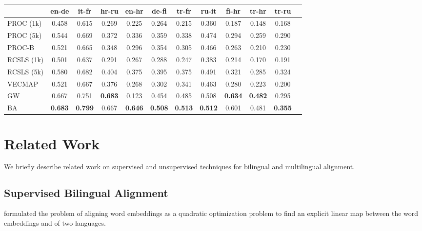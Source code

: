 \documentclass{article}
\begin{document}
\begin{table*}[ht!]
\centering

\begin{tabular}{@{}l@{}*{11}{c}@{}}
    \hline
    & en-de & it-fr & hr-ru & en-hr & de-fi & tr-fr & ru-it & fi-hr & tr-hr & tr-ru\\
    \hline
    PROC (1k)  & {0.458} & {0.615} & {0.269} & {0.225} & {0.264} & {0.215} & {0.360} & {0.187} & {0.148} & {0.168}\\
    PROC (5k) & {0.544} & {0.669} & {0.372} & {0.336} & {0.359} & {0.338} & {0.474} & {0.294} & {0.259} & {0.290}\\
    PROC-B & {0.521} & {0.665} & {0.348} & {0.296} & {0.354} & {0.305} & {0.466} & {0.263} & {0.210} & {0.230}\\
    RCSLS (1k) & {0.501} & {0.637} & {0.291} & {0.267} & {0.288} & {0.247} & {0.383} & {0.214} & {0.170} & {0.191}\\
    RCSLS (5k) & {0.580} & {0.682} & {0.404} & {0.375} & {0.395} & {0.375} & {0.491} & {0.321} & {0.285} & {0.324}\\
    VECMAP & {0.521} & {0.667} & {0.376} & {0.268} & {0.302} & {0.341} & {0.463} & {0.280} & {0.223} & {0.200} \\
    GW & {0.667} & {0.751} & \textbf{0.683} & {0.123} & {0.454} & {0.485} & {0.508} & \textbf{0.634} & \textbf{0.482} & {0.295} \\
    BA & \textbf{0.683} & \textbf{0.799} & {0.667} & \textbf{0.646} & \textbf{0.508} & \textbf{0.513} & \textbf{0.512} & {0.601} & {0.481} & \textbf{0.355}\\
\hline
\end{tabular}
\label{table:experiment2}
\end{table*}




 \section{Related Work}


We briefly describe related work on supervised and unsupervised techniques for bilingual and multilingual alignment.

\subsection{Supervised Bilingual Alignment}

\citet{MikolovLS13} formulated the problem of aligning word embeddings as a quadratic optimization problem to find an explicit linear map  between the word embeddings  and  of two languages. 
\end{document}
